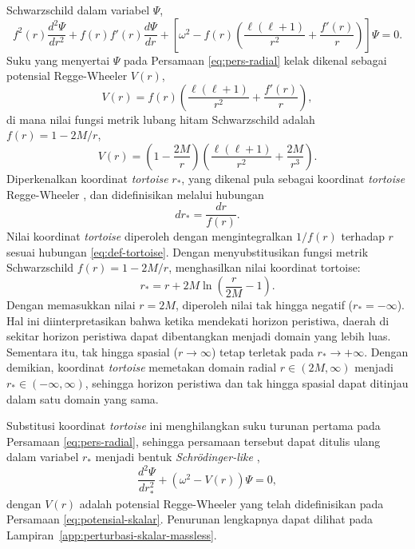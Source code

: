 Schwarzschild dalam variabel $\Psi$,
\begin{equation}
    f^2(r)\frac{d^2\Psi}{dr^2} + f(r)f'(r)\frac{d\Psi}{dr} + \left[\omega^2 - f(r)\left(\frac{\ell(\ell+1)}{r^2} + \frac{f'(r)}{r}\right)\right]\Psi = 0.
    \label{eq:pers-radial}
\end{equation}
Suku yang menyertai $\Psi$ pada 
Persamaan \eqref{eq:pers-radial} kelak dikenal sebagai potensial 
Regge-Wheeler $V(r)$,
\begin{equation}
    V(r) = f(r) \left( \frac{\ell(\ell+1)}{r^2} + \frac{f'(r)}{r} \right),
    \label{eq:potensial-skalar}
\end{equation}
di mana nilai fungsi metrik lubang hitam Schwarzschild adalah $f(r) = 1 - 2M/r$,
\begin{equation}
    V(r) = \left( 1 - \frac{2M}{r} \right) \left( \frac{\ell(\ell+1)}{r^2} + \frac{2M}{r^3} \right).
    \label{eq:potensial-schwarzschild-skalar}
\end{equation}
Diperkenalkan koordinat \textit{tortoise} $r_*$, yang dikenal pula sebagai koordinat
\textit{tortoise} Regge-Wheeler \parencite{Regge1957}, dan didefinisikan melalui
hubungan
\begin{equation}
    dr_* = \frac{dr}{f(r)}.
    \label{eq:def-tortoise}
\end{equation}
Nilai koordinat \textit{tortoise} diperoleh dengan mengintegralkan $1/f(r)$ terhadap $r$
sesuai hubungan \eqref{eq:def-tortoise}. Dengan menyubstitusikan fungsi metrik Schwarzschild
$f(r) = 1 - 2M/r$, menghasilkan nilai koordinat tortoise:
\begin{equation}
    r_* = r + 2M \ln \left(\frac{r}{2M} - 1\right).
    \label{eq:koordinat-tortoise}
\end{equation}
Dengan memasukkan nilai $r = 2M$, diperoleh nilai tak hingga negatif ($r_* = -\infty$).
Hal ini diinterpretasikan bahwa ketika mendekati horizon peristiwa, daerah di sekitar horizon peristiwa 
dapat dibentangkan menjadi domain yang lebih luas. Sementara itu,
tak hingga spasial ($r \to \infty$) tetap terletak pada $r_* \to +\infty$. Dengan demikian,
koordinat \textit{tortoise} memetakan domain radial $r \in (2M, \infty)$ menjadi
$r_* \in (-\infty, \infty)$, sehingga horizon peristiwa dan tak hingga spasial dapat ditinjau
dalam satu domain yang sama.

Substitusi koordinat \textit{tortoise} ini menghilangkan suku turunan pertama pada Persamaan 
\eqref{eq:pers-radial}, sehingga persamaan tersebut dapat ditulis ulang dalam variabel $r_*$ 
menjadi bentuk \textit{Schr\"{o}dinger-like} \parencite{Konoplya2011},
\begin{equation}
    \frac{d^2 \Psi}{dr_*^2} + \left( \omega^2 - V(r) \right) \Psi = 0,
    \label{eq:master-skalar}
\end{equation}
dengan $V(r)$ adalah potensial Regge-Wheeler yang telah didefinisikan pada Persamaan 
\eqref{eq:potensial-skalar}. Penurunan lengkapnya dapat dilihat pada 
Lampiran~\ref{app:perturbasi-skalar-massless}.


